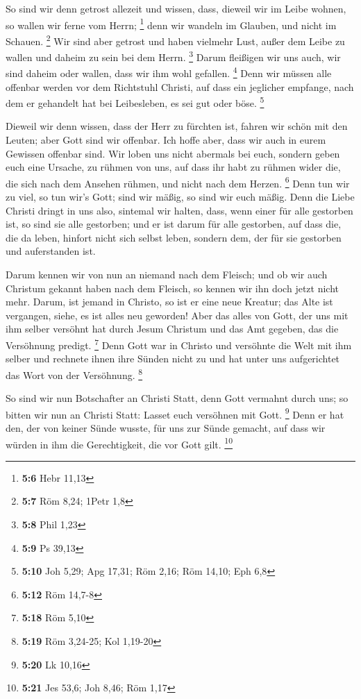 So sind wir denn getrost allezeit und wissen, dass, dieweil
wir im Leibe wohnen, so wallen wir ferne vom Herrn; \footnote{\textbf{5:6}
  Hebr 11,13}  denn wir wandeln im Glauben, und nicht im
Schauen. \footnote{\textbf{5:7} Röm 8,24; 1Petr 1,8}  Wir
sind aber getrost und haben vielmehr Lust, außer dem Leibe zu wallen und
daheim zu sein bei dem Herrn. \footnote{\textbf{5:8} Phil 1,23}
 Darum fleißigen wir uns auch, wir sind daheim oder wallen,
dass wir ihm wohl gefallen. \footnote{\textbf{5:9} Ps 39,13}
 Denn wir müssen alle offenbar werden vor dem Richtstuhl
Christi, auf dass ein jeglicher empfange, nach dem er gehandelt hat bei
Leibesleben, es sei gut oder böse. \footnote{\textbf{5:10} Joh 5,29; Apg
  17,31; Röm 2,16; Röm 14,10; Eph 6,8}

 Dieweil wir denn wissen, dass der Herr zu fürchten ist,
fahren wir schön mit den Leuten; aber Gott sind wir offenbar. Ich hoffe
aber, dass wir auch in eurem Gewissen offenbar sind.  Wir
loben uns nicht abermals bei euch, sondern geben euch eine Ursache, zu
rühmen von uns, auf dass ihr habt zu rühmen wider die, die sich nach dem
Ansehen rühmen, und nicht nach dem Herzen. \footnote{\textbf{5:12} Röm
  14,7-8}  Denn tun wir zu viel, so tun wir's Gott; sind
wir mäßig, so sind wir euch mäßig.  Denn die Liebe Christi
dringt in uns also, sintemal wir halten, dass, wenn einer für alle
gestorben ist, so sind sie alle gestorben;  und er ist
darum für alle gestorben, auf dass die, die da leben, hinfort nicht sich
selbst leben, sondern dem, der für sie gestorben und auferstanden ist.

 Darum kennen wir von nun an niemand nach dem Fleisch; und
ob wir auch Christum gekannt haben nach dem Fleisch, so kennen wir ihn
doch jetzt nicht mehr.  Darum, ist jemand in Christo, so
ist er eine neue Kreatur; das Alte ist vergangen, siehe, es ist alles
neu geworden!  Aber das alles von Gott, der uns mit ihm
selber versöhnt hat durch Jesum Christum und das Amt gegeben, das die
Versöhnung predigt. \footnote{\textbf{5:18} Röm 5,10}  Denn
Gott war in Christo und versöhnte die Welt mit ihm selber und rechnete
ihnen ihre Sünden nicht zu und hat unter uns aufgerichtet das Wort von
der Versöhnung. \footnote{\textbf{5:19} Röm 3,24-25; Kol 1,19-20}

 So sind wir nun Botschafter an Christi Statt, denn Gott
vermahnt durch uns; so bitten wir nun an Christi Statt: Lasset euch
versöhnen mit Gott. \footnote{\textbf{5:20} Lk 10,16}  Denn
er hat den, der von keiner Sünde wusste, für uns zur Sünde gemacht, auf
dass wir würden in ihm die Gerechtigkeit, die vor Gott gilt. \footnote{\textbf{5:21}
  Jes 53,6; Joh 8,46; Röm 1,17}

